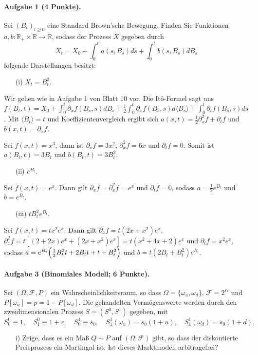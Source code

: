 \documentclass{article}
\begin{document}
\paragraph{Aufgabe 1 \textnormal{(4 Punkte)}.} Sei $(B_t)_{t\geq0}$ eine Standard Brown'sche Bewegung.
Finden Sie Funktionen $a,b\colon \mathbb{R}_+\times\mathbb{R}\to\mathbb{R}$, sodass der Prozess $X$ gegeben durch \[X_t=X_0+\int_0^ta(s,B_s)ds+\int_0^tb(s,B_s)dB_s\]
folgende Darstellungen besitzt:
\begin{itemize}
\item[(i)] $X_t=B_t^3$.
\end{itemize}
Wir gehen wie in Aufgabe 1 von Blatt 10 vor.
Die Itô-Formel sagt uns $f(B_t,t)=X_0+\int_0^t\partial_xf(B_s,s)dB_s+\frac{1}{2}\int_0^t\partial_xf(B_s,s)d\langle B_s\rangle+\int_0^t\partial_t f(B_s,s)ds$.
Mit $\langle B_t\rangle=t$ und Koeffizientenvergleich ergibt sich $a(x,t)=\frac{1}{2}\partial_x^2f+\partial_tf$ und $b(x,t)=\partial_xf$.

Sei $f(x,t)=x^3$, dann ist $\partial_x f=3x^2$, $\partial^2_xf=6x$ und $\partial_tf=0$.
Somit ist $a(B_t,t)=3B_t$ und $b(B_t,t)=3B_t^2$.
\begin{itemize}
\item [(ii)] $e^{B_t}$.
\end{itemize}
Sei $f(x,t)=e^x$.
Dann gilt $\partial_x f=\partial_x^2f=e^x$ und $\partial_tf=0$, sodass $a=\frac{1}{2}e^{B_t}$ und $b=e^{B_t}$.
\begin{itemize}
\item [(iii)] $tB_t^2e^{B_t}$.
\end{itemize}
Sei $f(x,t)=tx^2e^x$.
Dann gilt $\partial_xf=t(2x+x^2)e^x$, $\partial_x^2f=t[(2+2x)e^x+(2x+x^2)e^x]=t(x^2+4x+2)e^x$ und $\partial_tf=x^2e^x$, sodass $a=e^{B_t}\Bigl(\frac{1}{2}B_t^2t+2B_tt+t+B_t^2\Bigr)$ und $b=t(2B_t+B_t^2)e^{B_t}$.
\paragraph{Aufgabe 3 \textnormal{(Binomiales Modell; 6 Punkte)}.}
Sei $(\Omega,\mathscr{F},P)$ ein Wahr\-schein\-lich\-keits\-raum, so dass $\Omega=\{\omega_u,\omega_d\}$, $\mathscr{F}=2^\Omega$ und $P[\omega_u]=p=1-P[\omega_d]$.
Die gehandelten Vermögenswerte werden durch den zweidimensionalen Pro\-zess $S=(S^0,S^1)$ gegeben, mit
\begin{equation}
  \label{eq:a3s}
  S_0^0\equiv1,\quad S^0_1\equiv1+r,\quad S^1_0\equiv s_0,\quad S^1_1(\omega_u)=s_0(1+u),\quad S_1^1(\omega_d)=s_0(1+d).
\end{equation}
\begin{itemize}
\item [i)] Zeige, dass es ein Maß $Q\sim P$ auf $(\Omega,\mathscr{F})$ gibt, so dass der dis\-kon\-tier\-te Preisprozess ein Martingal ist.
  Ist dieses Marktmodell arbitragefrei?
\end{itemize}
\end{document}
